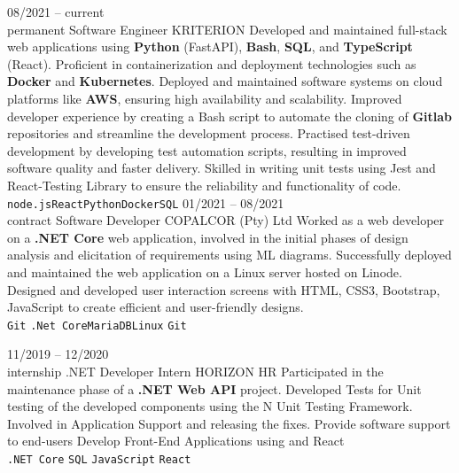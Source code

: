 \documentclass[10pt]{developercv} %
\begin{document}
\begin{entrylist}
	\entry
		{08/2021 -- current\\\footnotesize{permanent}}
		{Software Engineer}
		{KRITERION}
		{
            Developed and maintained full-stack web applications using \textbf{Python} (FastAPI), \textbf{Bash}, \textbf{SQL}, and \textbf{TypeScript} (React).
            Proficient in containerization and deployment technologies such as \textbf{Docker} and \textbf{Kubernetes}.
            Deployed and maintained software systems on cloud platforms like \textbf{AWS}, ensuring high availability and scalability.
            Improved developer experience by creating a Bash script to automate the cloning of \textbf{Gitlab} repositories and streamline the development process.
            Practised test-driven development by developing test automation scripts, resulting in improved software quality and faster delivery.
            Skilled in writing unit tests using Jest and React-Testing Library to ensure the reliability and functionality of code.\\
            \texttt {node.js}\slashsep\texttt{React}\slashsep\texttt{Python}\slashsep\texttt{Docker}\slashsep\texttt{SQL}
        }
	\entry
		{01/2021 -- 08/2021 \\\footnotesize{contract}}
		{Software Developer}
		{COPALCOR (Pty) Ltd}
		{
            Worked as a web developer on a \textbf{.NET Core} web application, involved in the initial phases of design analysis and elicitation of requirements using ML diagrams.
            Successfully deployed and maintained the web application on a Linux server hosted on Linode.
            Designed and developed user interaction screens with HTML, CSS3, Bootstrap, JavaScript to create efficient and user-friendly designs.\\
            \texttt{Git} \slashsep\texttt{.Net Core}\slashsep\texttt{MariaDB}\slashsep\texttt{Linux} \slashsep\texttt{Git}
        }

	\entry
		{11/2019 -- 12/2020 \\\footnotesize{internship}}
		{.NET Developer Intern}
		{HORIZON HR}
		{
            Participated in the maintenance phase of a \textbf{.NET Web API} project.
            Developed Tests for Unit testing of the developed components using the N Unit Testing Framework.
            Involved in Application Support and releasing the fixes.
            Provide software support to end-users
            Develop Front-End Applications using and React \\
            \texttt{.NET Core} \slashsep\texttt{SQL} \slashsep\texttt{JavaScript} \slashsep\texttt{React}
    }
\end{entrylist}
\end{document}
